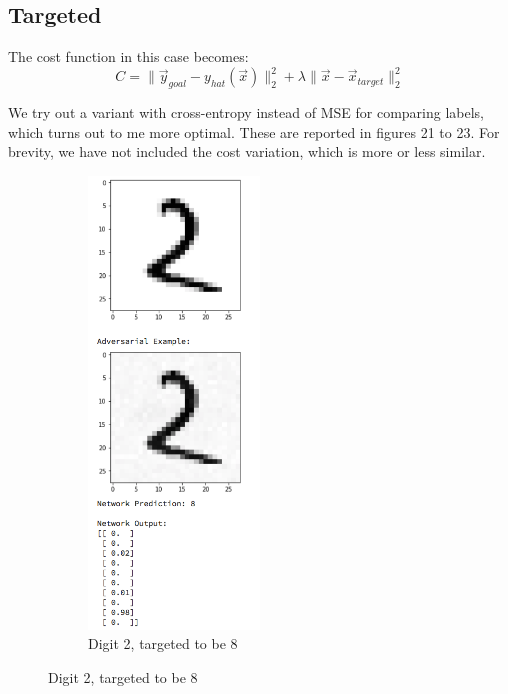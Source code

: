 \subsection{Targeted}
The cost function in this case becomes:
$$ C = \|\vec y_{goal} - y_{hat}(\vec x)\|^2_2 + \lambda \|\vec x - \vec x_{target}\|^2_2 $$

We try out a variant with cross-entropy instead of MSE for comparing labels, which turns out to me more optimal. These are reported in figures 21 to 23. For brevity, we have not included the cost variation, which is more or less similar.



\begin{figure}[!htbp]
\begin{subfigure}
\centering
\includegraphics[angle=0,width=0.5\textwidth]{assign-2/logs/adv/tar/2.png}
\caption{Digit 2, targeted to be 8 }
\end{subfigure}
\end{figure}
